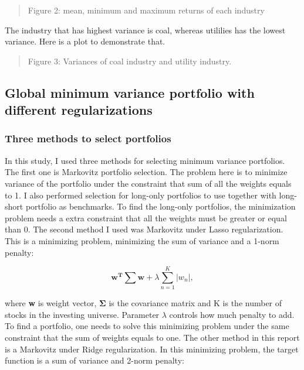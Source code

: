 \documentclass{article}
\newcommand{\ciapdf}[1]{\vspace*{-\parskip}\begin{center}\resizebox{0.75\textwidth}{!}{\texttt{[image: \#1]}}\end{center}}
\begin{document}
\ciapdf{Figure_2T2.pdf}

\begin{quote}
Figure 2: mean, minimum and maximum returns of each industry
\end{quote}

The industry that has highest variance is coal, whereas utililies has the lowest
variance. Here is a plot to demonstrate that.

\ciapdf{Figure_3T2.pdf}

\begin{quote}
Figure 3: Variances of coal industry and utility industry.
\end{quote}

\subsection*{Global minimum variance portfolio with different regularizations}

\subsubsection*{Three methods to select portfolios}

In this study, I used three methods for selecting minimum variance portfolios.
The first one is Markovitz portfolio selection. The problem here is to minimize variance
of the portfolio under the constraint that sum of all the weights equals to 1.
I also performed selection for long-only portfolios to use together with long-short
portfolio as benchmarks. To find the long-only portfolios, the minimization problem
needs a extra constraint that all the weights must be greater or equal than 0. The second
method I used was Markovitz under Lasso regularization. This is a minimizing
problem, minimizing the sum of variance and a 1-norm penalty:

\begin{equation*}
\mathbf{w^T\sum w} + \lambda \sum_{n= 1}^{K}\left | w_n \right |,
\end{equation*}

where \textbf{w} is weight vector, $\mathbf{\Sigma}$ is the covariance matrix
and K is the number of stocks in the investing universe. Parameter $\lambda$
controls how much penalty to add. To find a portfolio, one needs to
solve this minimizing problem under the same constraint that the sum of weights equals
to one. The other method in this report is a Markovitz under Ridge regularization.
In this minimizing problem, the target function is a sum of variance and 2-norm
penalty:
\end{document}
